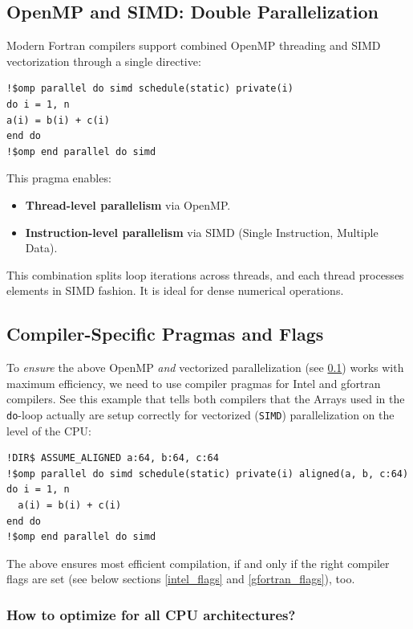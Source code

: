 \documentclass{article}
\begin{document}
\subsection{OpenMP and SIMD: Double Parallelization}
\label{thread_and_vectorized_parallelization}
Modern Fortran compilers support combined OpenMP threading and SIMD vectorization through a single directive:

\begin{verbatim}
!$omp parallel do simd schedule(static) private(i)
do i = 1, n
a(i) = b(i) + c(i)
end do
!$omp end parallel do simd
\end{verbatim}

This pragma enables:
\begin{itemize}
\item \textbf{Thread-level parallelism} via OpenMP.
\item \textbf{Instruction-level parallelism} via SIMD (Single Instruction, Multiple Data).
\end{itemize}

This combination splits loop iterations across threads, and each thread processes elements in SIMD fashion. It is ideal for dense numerical operations.

\subsection{Compiler-Specific Pragmas and Flags}

To \emph{ensure} the above OpenMP \emph{and} vectorized parallelization (see
\ref{thread_and_vectorized_parallelization}) works with maximum efficiency, we
need to use compiler pragmas for Intel and gfortran compilers. See this example
that tells both compilers that the Arrays used in the \texttt{do}-loop actually
are setup correctly for vectorized (\texttt{SIMD}) parallelization on the level
of the CPU:

\begin{verbatim}
!DIR$ ASSUME_ALIGNED a:64, b:64, c:64
!$omp parallel do simd schedule(static) private(i) aligned(a, b, c:64)
do i = 1, n
  a(i) = b(i) + c(i)
end do
!$omp end parallel do simd
\end{verbatim}

The above ensures most efficient compilation, if and only if the right compiler
flags are set (see below sections \ref{intel_flags} and \ref{gfortran_flags}),
too.

\subsubsection{How to optimize for all CPU architectures?}
\label{simd_architecture_macros}
\end{document}

